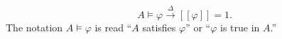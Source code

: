 $$A \models \varphi \xrightarrow{\Delta} [\![\varphi]\!] = 1.$$
The notation $A \models \varphi$ is read ``$A$ satisfies $\varphi$'' or ``$\varphi$ is true in $A$.''

